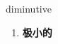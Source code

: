 
\begin{frame}
{\huge diminutive}
\begin{center}
\begin{enumerate}\Large
  \item \textbf{极小的}
\end{enumerate}
\end{center}
\end{frame}
